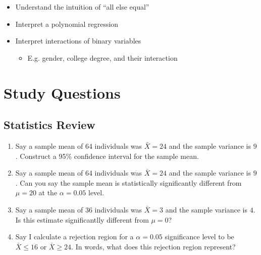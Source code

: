 \documentclass[12pt]{article}
\begin{document}
\begin{enumerate}
\begin{itemize}
    \item Understand the intuition of ``all else equal''
    
    \item Interpret a polynomial regression
    
    \item Interpret interactions of binary variables 
    \begin{itemize}
      \item E.g. gender, college degree, and their interaction
    \end{itemize}
  \end{itemize}
\end{enumerate}



\newpage
\section*{Study Questions}
\subsection*{Statistics Review}
\begin{enumerate}
  \item Say a sample mean of 64 individuals was $\bar{X} = 24$ and the sample variance is $9$. Construct a 95\% confidence interval for the sample mean.
  
  \item Say a sample mean of 64 individuals was $\bar{X} = 24$ and the sample variance is $9$. Can you say the sample mean is statistically significantly different from $\mu = 20$ at the $\alpha = 0.05$ level.
  
  \item Say a sample mean of 36 individuals was $\bar{X} = 3$ and the sample variance is $4$. Is this estimate significantlly different from $\mu = 0$?  
  
  \item Say I calculate a rejection region for a $\alpha = 0.05$ significance level to be $\bar{X} \leq 16$ or $\bar{X} \geq 24$. In words, what does this rejection region represent?
\end{enumerate}
\end{document}
